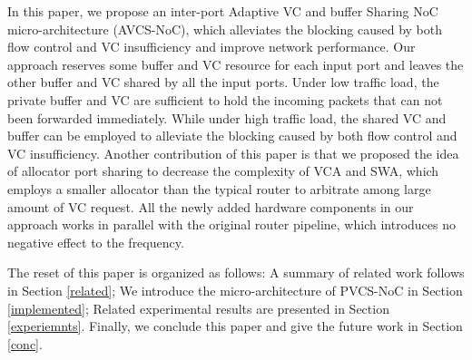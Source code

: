 \documentclass[10pt,conference]{IEEEtran}
\begin{document}

In this paper, we propose an inter-port Adaptive VC and buffer Sharing NoC micro-architecture (AVCS-NoC), which alleviates the blocking caused by both flow control and VC insufficiency and improve network performance. Our approach reserves some buffer and VC resource for each input port and leaves the other buffer and VC shared by all the input ports. Under low traffic load, the private buffer and VC are sufficient to hold the incoming packets that can not been forwarded immediately. While under high traffic load, the shared VC and buffer can be employed to alleviate the blocking caused by both flow control and VC insufficiency. Another contribution of this paper is that we proposed the idea of allocator port sharing to decrease the complexity of VCA and SWA, which employs a smaller allocator than the typical router to arbitrate among large amount of VC request. All the newly added hardware components in our approach works in parallel with the original router pipeline, which introduces no negative effect to the frequency.

The reset of this paper is organized as follows: A summary of related work follows in Section \ref{related}; We introduce the micro-architecture of PVCS-NoC in Section \ref{implemented}; Related experimental results are presented in Section \ref{experiemnts}. Finally, we conclude this paper and give the future work in Section \ref{conc}.

\end{document}
